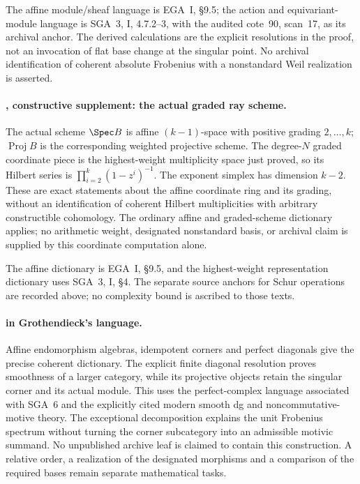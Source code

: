 The affine module/sheaf language is EGA~I, \S9.5; the action and
equivariant-module language is SGA~3, I, 4.7.2--3, with the audited
cote~90, scan~17, as its archival anchor. The derived calculations
are the explicit resolutions in the proof, not an invocation of
flat base change at the singular point. No archival identification
of coherent absolute Frobenius with a nonstandard Weil realization
is asserted.


\paragraph{, constructive supplement: the actual graded ray scheme.}
The actual scheme $\Spec B$ is affine $(k-1)$-space with positive
grading $2,\ldots,k$; $\operatorname{Proj}B$ is the corresponding
weighted projective scheme. The degree-$N$ graded coordinate piece
is the highest-weight multiplicity space just proved, so its Hilbert
series is $\prod_{i=2}^k(1-z^i)^{-1}$. The exponent simplex has
dimension $k-2$. These are exact statements about the affine
coordinate ring and its grading, without an identification of
coherent Hilbert multiplicities with arbitrary constructible
cohomology. The ordinary affine and graded-scheme dictionary applies;
no arithmetic weight, designated nonstandard basis, or archival
claim is supplied by this coordinate computation alone.

The affine dictionary is EGA~I, \S9.5, and the highest-weight representation dictionary uses SGA~3, I, \S4. The separate source anchors for Schur operations are recorded above; no complexity bound is ascribed to those texts.


\paragraph{ in Grothendieck's language.}
Affine endomorphism algebras, idempotent corners and perfect
diagonals give the precise coherent dictionary. The explicit
finite diagonal resolution proves smoothness of a larger category,
while its projective objects retain the singular corner and its
actual module. This uses the perfect-complex language associated
with SGA~6 and the explicitly cited modern smooth dg and
noncommutative-motive theory. The exceptional decomposition
explains the unit Frobenius spectrum without turning the corner
subcategory into an admissible motivic summand. No unpublished
archive leaf is claimed to contain this construction. A relative
order, a realization of the designated morphisms and a comparison
of the required bases remain separate mathematical tasks.

